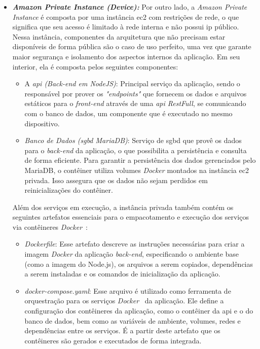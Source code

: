 \begin{itemize}
  \item \textbf{\textit{Amazon Private Instance (Device):}} Por outro lado, a \textit{Amazon Private Instance} é composta por uma instância \gls{ec2} com restrições de rede, o que significa que seu acesso é limitado à rede interna e não possui \gls{ip} público. Nessa instância, componentes da arquitetura que não precisam estar disponíveis de forma pública são o caso de uso perfeito, uma vez que garante maior segurança e isolamento dos aspectos internos da aplicação. Em seu interior, ela é composta pelos seguintes componentes:
    \begin{itemize}
      \item A \textit{\gls{api} (Back-end em NodeJS)}: Principal serviço da aplicação, sendo o responsável por prover os \emph{"endpoints"} que fornecem os dados e arquivos estáticos para o \textit{front-end} através de uma \textit{\gls{api} RestFull}, se comunicando com o banco de dados, um componente que é executado no mesmo dispositivo.
      \item \textit{Banco de Dados (\gls{sgbd} MariaDB)}: Serviço de \gls{sgbd} que provê os dados para o \textit{back-end} da aplicação, o que possibilita a persistência e consulta de forma eficiente. Para garantir a persistência dos dados gerenciados pelo MariaDB, o contêiner utiliza volumes \emph{Docker} montados na instância \gls{ec2} privada. Isso assegura que os dados não sejam perdidos em reinicializações do contêiner.
    \end{itemize}
  Além dos serviços em execução, a instância privada também contém os seguintes artefatos essenciais para o empacotamento e execução dos serviços via contêineres \emph{Docker}~\cite{DockerDocs}:
    \begin{itemize}
      \item \textit{Dockerfile}: Esse artefato descreve as instruções necessárias para criar a imagem \emph{Docker} da aplicação \textit{back-end}, especificando o ambiente base (como a imagem do Node.js), os arquivos a serem copiados, dependências a serem instaladas e os comandos de inicialização da aplicação.

      \item \textit{docker-compose.yaml}: Esse arquivo é utilizado como ferramenta de orquestração para os serviços \emph{Docker}~\cite{DockerComposeDocs} da aplicação. Ele define a configuração dos contêineres da aplicação, como o contêiner da \gls{api} e o do banco de dados, bem como as variáveis de ambiente, volumes, redes e dependências entre os serviços. É a partir deste artefato que os contêineres são gerados e executados de forma integrada.
    \end{itemize}


\end{itemize}
